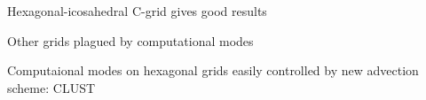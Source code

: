 \begin{slide}

\begin{list0}
\item Hexagonal-icosahedral C-grid gives good results
\item Other grids plagued by computational modes
\item Computaional modes on hexagonal grids easily controlled by new advection scheme: CLUST
\end{list0}

\end{slide}

